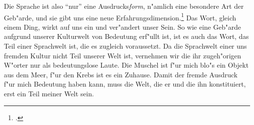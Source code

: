 \documentclass[a4paper, 12pt]{article}
\begin{document}
\begin{onehalfspace}
Die Sprache ist also "`nur"' eine Ausdrucks\emph{form}, n"amlich eine besondere Art der Geb"arde, und sie gibt uns eine neue Erfahrungsdimension.\footnote{\cite[Vgl.][S. 216 f.]{merleau1966phanomenologie}.} Das Wort, gleich einem Ding, wirkt auf uns ein und ver"andert unser Sein. So wie eine Geb"arde aufgrund unserer Kulturwelt von Bedeutung erf"ullt ist, ist es auch das Wort, das Teil einer Sprachwelt ist, die es zugleich voraussetzt. Da die Sprachwelt einer uns fremden Kultur nicht Teil unserer Welt ist, vernehmen wir die ihr zugeh"origen W"orter nur als bedeutungslose Laute. Die Muschel ist f"ur mich blo"s ein Objekt aus dem Meer, f"ur den Krebs ist es ein Zuhause. Damit der fremde Ausdruck f"ur mich Bedeutung haben kann, muss die Welt, die er und die ihn konstituiert, erst ein Teil meiner Welt sein. 



\end{onehalfspace}
\nocite{*}
%
\printbibliography
\end{document}
